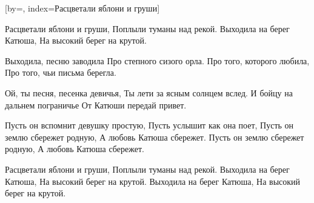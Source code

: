 [by={},
                     index={Расцветали яблони и груши}]
\beginverse

Расцветали яблони и груши,
Поплыли туманы над рекой.
Выходила на берег Катюша,
На высокий берег на крутой.

\endverse
\beginverse

Выходила, песню заводила
Про степного сизого орла.
Про того, которого любила,
Про того, чьи письма берегла.

\endverse
\beginverse

Ой, ты песня, песенка девичья,
Ты лети за ясным солнцем вслед.
И бойцу на дальнем пограничье
От Катюши передай привет.

\endverse
\beginverse

Пусть он вспомнит девушку простую,
Пусть услышит как она поет,
Пусть он землю сбережет родную,
А любовь Катюша сбережет.
Пусть он землю сбережет родную,
А любовь Катюша сбережет.

\endverse
\beginverse

Расцветали яблони и груши,
Поплыли туманы над рекой.
Выходила на берег Катюша,
На высокий берег на крутой.
Выходила на берег Катюша,
На высокий берег на крутой.

\endverse
\endsong